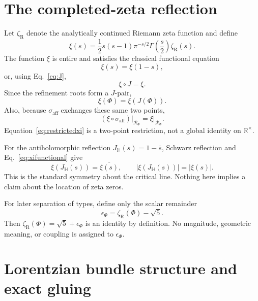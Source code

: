 \documentclass[10pt,oneside]{article}
\theoremstyle{plaincompact}
\theoremstyle{definitioncompact}
\newcommand{\R}{\mathbb R}
\newcommand{\Hh}{\mathbb H}
\begin{document}
\section{The completed-zeta reflection}

Let $\zeta_{\mathrm R}$ denote the analytically continued Riemann zeta function
and define
\begin{equation}\label{eq:xi}
\xi(s)=\frac12s(s-1)\pi^{-s/2}
\Gamma\!\left(\frac s2\right)\zeta_{\mathrm R}(s).
\end{equation}
The function $\xi$ is entire and satisfies the classical functional
equation~\cite{Titchmarsh}
\begin{equation}\label{eq:xifunctional}
\xi(s)=\xi(1-s),
\end{equation}
or, using Eq.~\eqref{eq:J},
\begin{equation}\label{eq:xiJ}
\xi\circ J=\xi.
\end{equation}
Since the refinement roots form a $J$-pair,
\begin{equation}\label{eq:xiroots}
\xi(\Phi)=\xi(J(\Phi)).
\end{equation}
Also, because $\sigma_{\mathrm{aff}}$ exchanges these same two points,
\begin{equation}\label{eq:restrictedxi}
\left.(\xi\circ\sigma_{\mathrm{aff}})\right|_{\mathcal R_\Phi}
=\left.\xi\right|_{\mathcal R_\Phi}.
\end{equation}
Equation~\eqref{eq:restrictedxi} is a two-point restriction, not a global
identity on $\R^\times$.

For the antiholomorphic reflection $J_{\Hh}(s)=1-\overline s$, Schwarz
reflection and Eq.~\eqref{eq:xifunctional} give
\begin{equation}\label{eq:modxi}
\xi(J_{\Hh}(s))=\overline{\xi(s)},
\qquad |\xi(J_{\Hh}(s))|=|\xi(s)|.
\end{equation}
This is the standard symmetry about the critical line.  Nothing here implies a
claim about the location of zeta zeros.

For later separation of types, define only the scalar remainder
\begin{equation}\label{eq:epsilon}
\epsilon_\Phi=\zeta_{\mathrm R}(\Phi)-\sqrt5.
\end{equation}
Then $\zeta_{\mathrm R}(\Phi)=\sqrt5+\epsilon_\Phi$ is an identity by
definition.  No magnitude, geometric meaning, or coupling is assigned to
$\epsilon_\Phi$.

\section{Lorentzian bundle structure and exact gluing}
\end{document}
